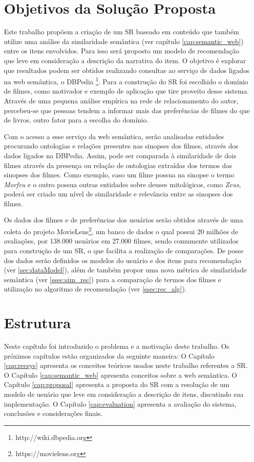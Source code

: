 \section{Objetivos da Solução Proposta}

Este trabalho propõem a criação de um SR baseado em conteúdo que também utilize uma análise da similaridade semântica (ver capítulo \ref{cap:semantic_web}) entre os itens envolvidos. Para isso será proposto um modelo de recomendação que leve em consideração a descrição da narrativa do item. O objetivo é explorar que resultados podem ser obtidos realizando consultas ao serviço de dados ligados na web semântica, o DBPedia \footnote{http://wiki.dbpedia.org}. Para a construção do SR foi escolhido o domínio de filmes, como motivador e exemplo de aplicação que tire proveito desse sistema. Através de uma pequena análise empírica na rede de relacionamento do autor, percebeu-se que pessoas tendem a informar mais das preferências de filmes do que de livros, outro fator para a escolha do domínio.

Com o acesso a esse serviço da web semântica, serão analisadas entidades procurando ontologias e relações presentes nas sinopses dos filmes, através dos dados ligados na DBPedia. Assim, pode ser comparada à similaridade de dois filmes através da presença ou relação de ontologias extraídas dos termos das sinopses dos filmes. Como exemplo, caso um filme possua na sinopse o termo \textit{Morfeu} e o outro possua outras entidades sobre deuses mitológicos, como \textit{Zeus}, poderá ser criado um nível de similaridade e relevância entre as sinopses dos filmes.

Os dados dos filmes e de preferências dos usuários serão obtidos através de uma coleta do projeto MovieLens\footnote{https://movielens.org}, um banco de dados o qual possui 20 milhões de avaliações, por 138.000 usuários em 27.000 filmes, sendo comumente utilizados para construção de um \ac{SR}, o que facilita a realização de comparações. De posse dos dados serão definidos os modelos do usuário e dos itens para recomendação (ver \ref{sec:dataModel}), além de também propor uma nova métrica de similaridade semântica (ver \ref{ssec:sim_rec}) para a comparação de termos dos filmes e utilização no algoritmo de recomendação (ver \ref{ssec:rec_alg}).

\section{Estrutura}
Neste capítulo foi introduzido o problema e a motivação deste trabalho. Os próximos capítulos estão organizados da seguinte maneira: O Capítulo \ref{cap:recsys} apresenta os conceitos teóricos usados neste trabalho referentes a SR. O Capítulo \ref{cap:semantic_web} apresenta conceitos sobre a web semântica. O Capítulo \ref{cap:proposal} apresenta a proposta do SR com a resolução de um modelo de usuário que leve em consideração a descrição de itens, discutindo sua implementação. O Capítulo \ref{cap:evaluation} apresenta a avaliação do sistema, conclusões e considerações finais.
